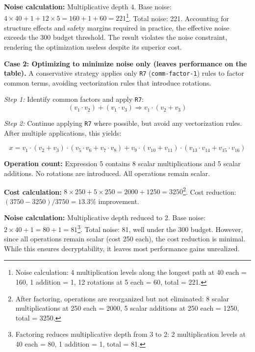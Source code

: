 \textbf{Noise calculation:} Multiplicative depth 4. Base noise: $4 \times 40 + 1 + 12 \times 5 = 160 + 1 + 60 = 221$\footnote{Noise calculation: 4 multiplication levels along the longest path at 40 each = 160, 1 addition = 1, 12 rotations at 5 each = 60, total = 221.}. Total noise: 221. Accounting for structure effects and safety margins required in practice, the effective noise exceeds the 300 budget threshold. The result violates the noise constraint, rendering the optimization useless despite its superior cost.

\textbf{Case 2: Optimizing to minimize noise only (leaves performance on the table).} A conservative strategy applies only \texttt{R7} (\texttt{comm-factor-1}) rules to factor common terms, avoiding vectorization rules that introduce rotations. 

\textit{Step 1:} Identify common factors and apply \texttt{R7}:
\[
(v_1 \cdot v_2) + (v_1 \cdot v_3) \Rightarrow v_1 \cdot (v_2 + v_3)
\]

\textit{Step 2:} Continue applying \texttt{R7} where possible, but avoid any vectorization rules. After multiple applications, this yields:

{
\shrink[1.2]
\CodeSize
\begin{equation}
x = v_1 \cdot (v_2 + v_3) \cdot (v_5 \cdot v_6 + v_7 \cdot v_8) + v_9 \cdot (v_{10} + v_{11}) \cdot (v_{13} \cdot v_{14} + v_{15} \cdot v_{16})
\label{eq:case2-final}
\tag{5}
\end{equation}
\shrink[1.2]
}

\textbf{Operation count:} Expression 5 contains 8 scalar multiplications and 5 scalar additions. No rotations are introduced. All operations remain scalar.

\textbf{Cost calculation:} $8 \times 250 + 5 \times 250 = 2000 + 1250 = 3250$\footnote{After factoring, operations are reorganized but not eliminated: 8 scalar multiplications at 250 each = 2000, 5 scalar additions at 250 each = 1250, total = 3250.}. Cost reduction: $(3750 - 3250) / 3750 = 13.3\%$ improvement.

\textbf{Noise calculation:} Multiplicative depth reduced to 2. Base noise: $2 \times 40 + 1 = 80 + 1 = 81$\footnote{Factoring reduces multiplicative depth from 3 to 2: 2 multiplication levels at 40 each = 80, 1 addition = 1, total = 81.}. Total noise: 81, well under the 300 budget. However, since all operations remain scalar (cost 250 each), the cost reduction is minimal. While this ensures decryptability, it leaves most performance gains unrealized.

